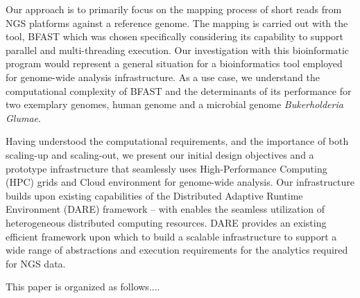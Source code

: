 \documentclass{acm_proc_article-sp}
\begin{document}
Our approach is to primarily focus on the mapping process of short
reads from NGS platforms against a reference genome.  The mapping is
carried out with the tool, BFAST\cite{bfast2009, bfast2009b} which was
chosen specifically considering its capability to support parallel and
multi-threading execution.  Our investigation with this bioinformatic
program would represent a general situation for a bioinformatics tool
employed for genome-wide analysis infrastructure.  As a use case, we
understand the computational complexity of BFAST\cite{bfast2009,
  bfast2009b} and the determinants of its performance for two
exemplary genomes, human genome and a microbial genome {\it
  Bukerholderia Glumae}.
 
Having understood the computational requirements, and the importance
of both scaling-up and scaling-out, we present our initial design
objectives and a prototype infrastructure that seamlessly uses
High-Performance Computing (HPC) grids and Cloud environment for
genome-wide analysis.  Our infrastructure builds upon existing
capabilities of the Distributed Adaptive Runtime Environment (DARE)
framework -- with enables the seamless utilization of heterogeneous
distributed computing resources.  DARE provides an existing efficient
framework upon which to build a scalable infrastructure to support a
wide range of abstractions and execution requirements for the
analytics required for NGS data.

This paper is organized as follows....




\end{document}
